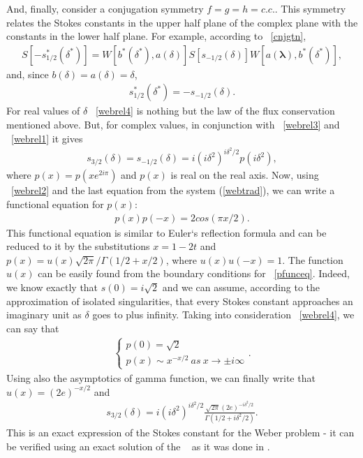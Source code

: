 \documentclass[12pt]{iopart}
\def\lmbd{\bm{\lambda}}
\begin{document}
And, finally, consider a conjugation symmetry $f=g=h=c.c.$. This symmetry relates the Stokes constants in the upper half plane of the complex plane with the constants in the lower half plane. For example, according to ~\ref{cnjgtn},
\begin{eqnarray}
S[-s_{1/2}^*(\delta^*)] = W[b^*(\delta^*),a(\delta)]S[s_{-1/2}(\delta)]W[a(\lmbd),b^*(\delta^*)],
\label{webcs1}
\end{eqnarray}
and, since $b(\delta)=a(\delta)=\delta$,
\begin{eqnarray}
s_{1/2}^*(\delta^*)=-s_{-1/2}(\delta).
\label{webrel4}
\end{eqnarray}
For real values of $\delta$ ~\ref{webrel4} is nothing but the law of the flux conservation mentioned above. But, for complex values, in conjunction with ~\ref{webrel3} and ~\ref{webrel1} it gives
\begin{eqnarray}
s_{3/2}(\delta)=s_{-1/2}(\delta)=i(i\delta^2)^{i\delta^2/2}p(i\delta^2),
\label{webrel4}
\end{eqnarray}
where $p(x)=p(x e^{2i\pi})$ and $p(x)$ is real on the real axis. Now, using ~\ref{webrel2} and the last equation from the 
system (\ref{webtrad}), we can write a functional equation for $p(x)$:
\begin{eqnarray}
p(x)p(-x)=2cos(\pi x/2).
\label{pfunceq}
\end{eqnarray}
This functional equation is similar to Euler`s reflection formula and can be reduced to it by the substitutions
$x=1-2t$ and $p(x)=u(x)\sqrt{2\pi}/\Gamma(1/2+x/2)$, where $u(x)u(-x)=1$. The function $u(x)$ can be easily found from the boundary conditions for ~\ref{pfunceq}. Indeed, we know exactly \cite{white} that $s(0)=i\sqrt{2}$ and we can assume, according to the approximation of isolated singularities, that every Stokes constant approaches an imaginary unit as $\delta$ goes to plus infinity. Taking into consideration ~\ref{webrel4}, we can say that
\begin{eqnarray}
\begin{cases} 
p(0) = \sqrt{2}\\
p(x) \sim x^{-x/2}\ as\ x \rightarrow \pm i \infty 
\end{cases}.
\label{pbnds}  
\end{eqnarray}
Using also the asymptotics of gamma function, we can finally write that $u(x)=(2e)^{-x/2}$ and
\begin{eqnarray}
s_{3/2}(\delta)=i(i\delta^2)^{i\delta^2/2}\frac{\sqrt{2\pi}(2e)^{-i\delta^2/2}}{\Gamma(1/2+i\delta^2/2)}.
\label{webfinal}  
\end{eqnarray}
This is an exact expression of the Stokes constant for the Weber problem - it can be verified using an exact solution 
of the ~ as it was done in \cite{ours}.
    
\end{document}
